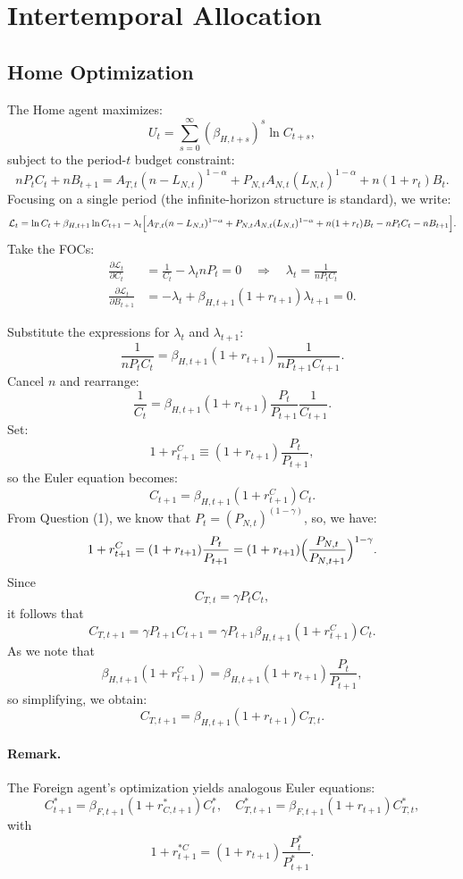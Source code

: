 \documentclass[a4paper,12pt]{article} %
\theoremstyle{nonitalic}
\begin{document}
\section{Intertemporal Allocation}

\subsection*{Home Optimization}
The Home agent maximizes:
\[
U_t = \sum_{s=0}^{\infty} (\beta_{H,t+s})^s \ln C_{t+s},
\]
subject to the period-$ t $ budget constraint:
\[
n P_t C_t + n B_{t+1} = A_{T,t} (n-L_{N,t})^{ 1-\alpha} + P_{N,t} A_{N,t} (L_{N,t})^{ 1-\alpha} + n(1+r_t)B_t.
\]
Focusing on a single period (the infinite-horizon structure is standard), we write:
\[
\mathcal{L}_t = \ln C_t + \beta_{H,t+1}\ln C_{t+1} - \lambda_t \Bigl[A_{T,t}(n-L_{N,t})^{1-\alpha} + P_{N,t}A_{N,t}(L_{N,t})^{1-\alpha} + n(1+r_t)B_t - n P_t C_t - n B_{t+1}\Bigr].
\]
Take the FOCs:
\begin{align*}
    \frac{\partial \mathcal{L}_t}{\partial C_t} &= \frac{1}{C_t} - \lambda_t nP_t = 0 \quad \Rightarrow \quad \lambda_t = \frac{1}{nP_t C_t} \\
    \frac{\partial \mathcal{L}_t}{\partial B_{t+1}} &= -\lambda_t + \beta_{H,t+1}(1+r_{t+1}) \lambda_{t+1} = 0.
\end{align*}

Substitute the expressions for \(\lambda_t\) and \(\lambda_{t+1}\):
\[
\frac{1}{nP_t C_t} = \beta_{H,t+1}(1+r_{t+1})\frac{1}{nP_{t+1} C_{t+1}}.
\]
Cancel \(n\) and rearrange:
\[
\frac{1}{C_t} = \beta_{H,t+1}(1+r_{t+1})\frac{P_t}{P_{t+1}}\frac{1}{C_{t+1}}.
\]
Set:
\[
1 + r_{t+1}^C \equiv (1+r_{t+1})\frac{P_t}{P_{t+1}},
\]
so the Euler equation becomes:
\[
\boxed{C_{t+1} = \beta_{H,t+1}(1+r_{t+1}^C)  C_t.}
\]
From Question (1), we know that $P_t = (P_{N,t})^{(1-\gamma)}$,
so, we have:
\[
1 + r_{t+1}^C = (1+r_{t+1})\frac{P_t}{P_{t+1}} = (1+r_{t+1})\Bigl(\frac{P_{N,t}}{P_{N,t+1}}\Bigr)^{1-\gamma}.
\]
Since
\[
C_{T,t} = \gamma P_t C_t,
\]
it follows that
\[
C_{T,t+1} = \gamma P_{t+1} C_{t+1} = \gamma P_{t+1} \beta_{H,t+1}(1+r_{t+1}^C) C_t.
\]
As we note that
\[
\beta_{H,t+1}(1+r_{t+1}^C) = \beta_{H,t+1}(1+r_{t+1})\frac{P_t}{P_{t+1}},
\]
so simplifying, we obtain:
\[
\boxed{C_{T,t+1} = \beta_{H,t+1}(1+r_{t+1})  C_{T,t}.}
\]

\paragraph{Remark.}  
The Foreign agent's optimization yields analogous Euler equations:
\[
C^*_{t+1} = \beta_{F,t+1}(1+r^*_{C,t+1})  C^*_t,\quad
C^*_{T,t+1} = \beta_{F,t+1}(1+r_{t+1})  C^*_{T,t},
\]
with
\[
1+r_{t+1}^{*C} = (1+r_{t+1})\frac{P^*_t}{P^*_{t+1}}.
\]
\end{document}
